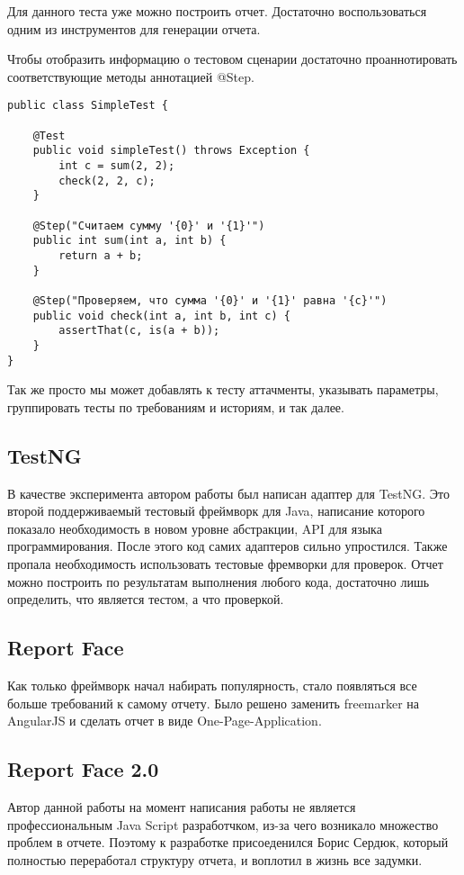 Для данного теста уже можно построить отчет. Достаточно воспользоваться одним из инструментов для генерации отчета.

Чтобы отобразить информацию о тестовом сценарии достаточно проаннотировать соответствующие методы аннотацией @Step.

\begin{lstlisting}
public class SimpleTest {

    @Test
    public void simpleTest() throws Exception {
        int c = sum(2, 2);
        check(2, 2, c);
    }
    
    @Step("Считаем сумму '{0}' и '{1}'")
    public int sum(int a, int b) {
		return a + b;
	}    
    
    @Step("Проверяем, что сумма '{0}' и '{1}' равна '{c}'")
    public void check(int a, int b, int c) {
    	assertThat(c, is(a + b));	
    }
}
\end{lstlisting}

Так же просто мы может добавлять к тесту аттачменты, указывать параметры, группировать тесты по требованиям и историям, и так далее.

\subsection{TestNG}

В качестве эксперимента автором работы был написан адаптер для TestNG. Это второй поддерживаемый тестовый фреймворк для Java, написание которого показало необходимость в новом уровне абстракции, API для языка программирования. После этого код самих адаптеров сильно упростился. Также пропала необходимость использовать тестовые фремворки для проверок. Отчет можно построить по результатам выполнения любого кода, достаточно лишь определить, что является тестом, а что проверкой.

\subsection{Report Face}

Как только фреймворк начал набирать популярность, стало появляться все больше требований к самому отчету. Было решено заменить freemarker на AngularJS и сделать отчет в виде One-Page-Application. 

\subsection{Report Face 2.0}

Автор данной работы на момент написания работы не является профессиональным Java Script разработчком, из-за чего возникало множество проблем в отчете. Поэтому к разработке присоеденился Борис Сердюк, который полностью переработал структуру отчета, и воплотил в жизнь все задумки.

